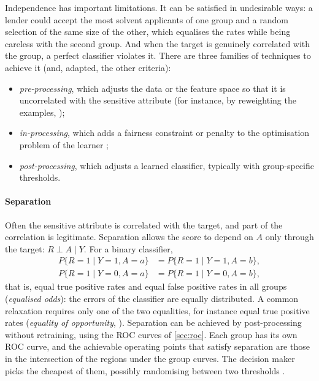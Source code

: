 Independence has important limitations. It can be satisfied in undesirable ways: a lender could
accept the most solvent applicants of one group and a random selection of the same size of the
other, which equalises the rates while being careless with the second group. And when the target
is genuinely correlated with the group, a perfect classifier violates it. There are three families
of techniques to achieve it (and, adapted, the other criteria): \begin{itemize}
\item \emph{pre-processing}, which
adjusts the data or the feature space so that it is uncorrelated with the sensitive attribute
(for instance, by reweighting the examples, \citealp{kamiran2012data}); \item \emph{in-processing},
which adds a fairness constraint or penalty to the optimisation problem of the learner
\citep{zafar2017fairness,agarwal2018reductions}; \item \emph{post-processing}, which adjusts a
learned classifier, typically with group-specific thresholds.
\end{itemize}

\paragraph{Separation} Often the sensitive attribute is correlated with the target, and part of
the correlation is legitimate. Separation allows the score to depend on $A$ only through the
target: $R\perp A\mid Y$. For a binary classifier,
\begin{align}
  P\{R=1\mid Y=1,A=a\}&=P\{R=1\mid Y=1,A=b\},\\
  P\{R=1\mid Y=0,A=a\}&=P\{R=1\mid Y=0,A=b\},
\end{align}
that is, equal true positive rates and equal false positive rates in all groups
(\emph{equalised odds}): the errors of the classifier are equally distributed. A common
relaxation requires only one of the two equalities, for instance equal true positive rates
(\emph{equality of opportunity}, \citealp{hardt2016equality}). Separation can be achieved by
post-processing without retraining, using the ROC curves of \cref{sec:roc}. Each group has its
own ROC curve, and the achievable operating points that satisfy separation are those in the
intersection of the regions under the group curves. The decision maker picks the cheapest of them,
possibly randomising between two thresholds \citep{hardt2016equality}.

